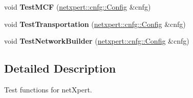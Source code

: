 \begin{DoxyCompactItemize}
\item 
void {\bfseries Test\+M\+CF} (\hyperlink{structnetxpert_1_1cnfg_1_1Config}{netxpert\+::cnfg\+::\+Config} \&cnfg)\hypertarget{namespacenetxpert_1_1test_a63ba4cc438e2057cc51f7a8eeebf9476}{}\label{namespacenetxpert_1_1test_a63ba4cc438e2057cc51f7a8eeebf9476}

\item 
void {\bfseries Test\+Transportation} (\hyperlink{structnetxpert_1_1cnfg_1_1Config}{netxpert\+::cnfg\+::\+Config} \&cnfg)\hypertarget{namespacenetxpert_1_1test_ae24dbcfbf301d78dd71889189857446c}{}\label{namespacenetxpert_1_1test_ae24dbcfbf301d78dd71889189857446c}

\item 
void {\bfseries Test\+Network\+Builder} (\hyperlink{structnetxpert_1_1cnfg_1_1Config}{netxpert\+::cnfg\+::\+Config} \&cnfg)\hypertarget{namespacenetxpert_1_1test_afda88e1fb2a4d1abfc7f42daf4fbc7bc}{}\label{namespacenetxpert_1_1test_afda88e1fb2a4d1abfc7f42daf4fbc7bc}

\end{DoxyCompactItemize}


\subsection{Detailed Description}
Test functions for net\+Xpert. 